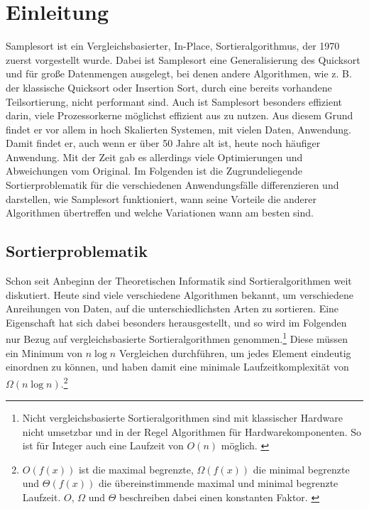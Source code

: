 \section{Einleitung}
	Samplesort ist ein Vergleichsbasierter, In-Place, Sortieralgorithmus, der 1970 zuerst vorgestellt wurde. \autocite{frazer-1970}
	Dabei ist Samplesort eine Generalisierung des Quicksort und für große Datenmengen ausgelegt, bei denen andere Algorithmen, wie z. B. der klassische Quicksort oder Insertion Sort, durch eine bereits vorhandene Teilsortierung, nicht performant sind.
	Auch ist Samplesort besonders effizient darin, viele Prozessorkerne möglichst effizient aus zu nutzen.
	Aus diesem Grund findet er vor allem in hoch Skalierten Systemen, mit vielen Daten, Anwendung.\\
	Damit findet er, auch wenn er über 50 Jahre alt ist, heute noch häufiger Anwendung.
	Mit der Zeit gab es allerdings viele Optimierungen und Abweichungen vom Original.
	Im Folgenden ist die Zugrundeliegende Sortierproblematik für die verschiedenen Anwendungsfälle differenzieren und darstellen, wie Samplesort funktioniert, wann seine Vorteile die anderer Algorithmen übertreffen und welche Variationen wann am besten sind.
	\subsection{Sortierproblematik}
		Schon seit Anbeginn der Theoretischen Informatik sind Sortieralgorithmen weit diskutiert.
		Heute sind viele verschiedene Algorithmen bekannt, um verschiedene Anreihungen von Daten, auf die unterschiedlichsten Arten zu sortieren.
		Eine Eigenschaft hat sich dabei besonders herausgestellt, und so wird im Folgenden nur Bezug auf vergleichsbasierte Sortieralgorithmen genommen.\footnote{Nicht vergleichsbasierte Sortieralgorithmen sind mit klassischer Hardware nicht umsetzbar und in der Regel Algorithmen für Hardwarekomponenten. So ist für Integer auch eine Laufzeit von $O(n)$ möglich. \autocite{abdel-hafeez-2017}}
		Diese müssen ein Minimum von $n\log{n}$ Vergleichen durchführen, um jedes Element eindeutig einordnen zu können, und haben damit eine minimale Laufzeitkomplexität von $\Omega(n\log{n})$.\footnote{$O(f(x))$ ist die maximal begrenzte, $\Omega(f(x))$ die minimal begrenzte und $\Theta(f(x))$ die übereinstimmende maximal und minimal begrenzte Laufzeit. $O$, $\Omega$ und $\Theta$ beschreiben dabei einen konstanten Faktor. \autocite[4]{sedgewick-1996}}
	
